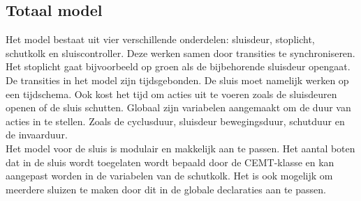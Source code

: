 \documentclass[../verslag.tex]{subfiles}
\begin{document}
\subsection{Totaal model}
Het model bestaat uit vier verschillende onderdelen: sluisdeur, stoplicht, schutkolk en sluiscontroller. Deze werken samen door transities te synchroniseren. Het stoplicht gaat bijvoorbeeld op groen als de bijbehorende sluisdeur opengaat.\\
De transities in het model zijn tijdsgebonden. De sluis moet namelijk werken op een tijdschema. Ook kost het tijd om acties uit te voeren zoals de sluisdeuren openen of de sluis schutten. Globaal zijn variabelen aangemaakt om de duur van acties in te stellen. Zoals de cyclusduur, sluisdeur bewegingsduur, schutduur en de invaarduur.\\
Het model voor de sluis is modulair en makkelijk aan te passen. Het aantal boten dat in de sluis wordt toegelaten wordt bepaald door de CEMT-klasse en kan aangepast worden in de variabelen van de schutkolk. Het is ook mogelijk om meerdere sluizen te maken door dit in de globale declaraties aan te passen.
\end{document}
